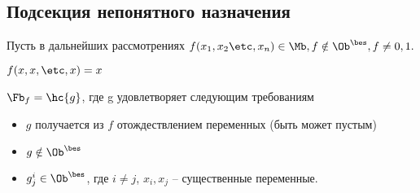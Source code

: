 \documentclass[unicode, 10pt, a4paper, oneside, fleqn]{article}
\begin{document}
\subsection{Подсекция непонятного назначения}
\begin{note}
  Пусть в дальнейших рассмотрениях 
  \begin{math}
    f(\set[x]{n}) \in \Mb, f \notin \Oib, f \neq 0,1.
  \end{math}
\end{note}
\begin{stm}
  \begin{math}
    f (x,x,\etc,x) =x
  \end{math}
\end{stm}
\begin{df}
  $\Ff = \hc{g}$, где g удовлетворяет следующим требованиям
    \begin{itemize}
      \item $g$ получается из $f$ отождествлением переменных (быть может пустым)
      \item $ g \notin \Oib$
      \item $g^i_j \in \Oib$, где $i\ne j$, $x_i,x_j$ -- существенные переменные.
    \end{itemize}
\end{df}
\end{document}

